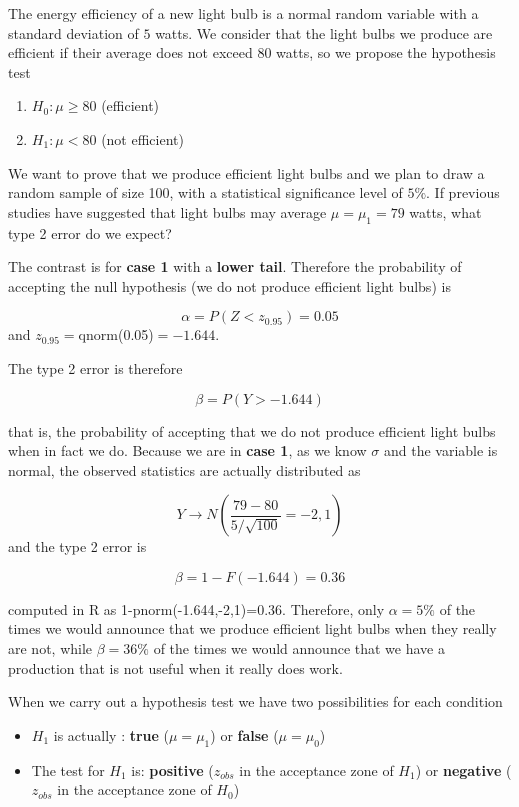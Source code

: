 \documentclass[
]{book}
\providecommand{\tightlist}{%
  \setlength{\itemsep}{0pt}\setlength{\parskip}{0pt}}
\begin{document}
The energy efficiency of a new light bulb is a normal random variable with a standard deviation of \(5\) watts. We consider that the light bulbs we produce are efficient if their average does not exceed \(80\) watts, so we propose the hypothesis test

\begin{enumerate}
\def\labelenumi{\alph{enumi}.}
\tightlist
\item
  \(H_0 : \mu \geq 80\) (efficient)
\item
  \(H_1 : \mu < 80\) (not efficient)
\end{enumerate}

We want to prove that we produce efficient light bulbs and we plan to draw a random sample of size 100, with a statistical significance level of \(5\%\). If previous studies have suggested that light bulbs may average \(\mu=\mu_1=79\) watts, what type 2 error do we expect?

The contrast is for \textbf{case 1} with a \textbf{lower tail}. Therefore the probability of accepting the null hypothesis (we do not produce efficient light bulbs) is

\[\alpha = P(Z< z_{0.95})=0.05\]
and \(z_{0.95}=\)qnorm(0.05)\(=-1.644\).

The type 2 error is therefore

\[\beta= P(Y > -1.644)\]

that is, the probability of accepting that we do not produce efficient light bulbs when in fact we do. Because we are in \textbf{case 1}, as we know \(\sigma\) and the variable is normal, the observed statistics are actually distributed as

\[Y \rightarrow N(\frac{79-80}{5/\sqrt{100}}=-2,1)\] and the type 2 error is

\[\beta = 1-F(-1.644)=0.36\]

computed in R as 1-pnorm(-1.644,-2,1)=0.36. Therefore, only \(\alpha=5\%\) of the times we would announce that we produce efficient light bulbs when they really are not, while \(\beta=36\%\) of the times we would announce that we have a production that is not useful when it really does work.

When we carry out a hypothesis test we have two possibilities for each condition

\begin{itemize}
\tightlist
\item
  \(H_1\) is actually : \textbf{true} (\(\mu=\mu_1\)) or \textbf{false} (\(\mu=\mu_0\))
\item
  The test for \(H_1\) is: \textbf{positive} (\(z_{obs}\) in the acceptance zone of \(H_1\)) or \textbf{negative} (\(z_{obs}\) in the acceptance zone of \(H_0\))
\end{itemize}
\end{document}
